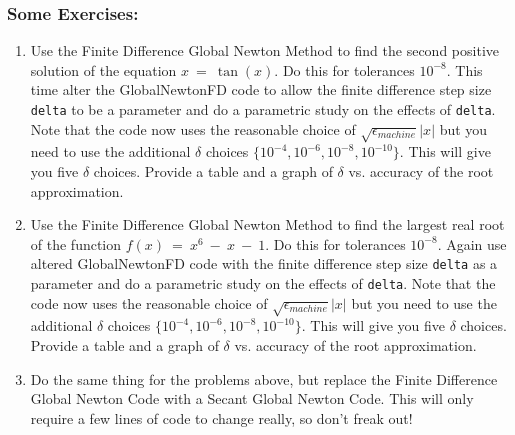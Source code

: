 \documentclass[11pt]{SelfArxOneColBMN}
\begin{document}
\subsubsection{Some Exercises:}

\begin{enumerate}
\item Use the Finite Difference Global Newton Method to find the second
      positive solution of the equation $x \: = \: \tan(x)$.  
      Do this for tolerances 
      $10^{-8}$.  This time alter the GlobalNewtonFD code to
      allow the finite difference step size {\tt delta}
      to be a parameter and do a parametric study on the
      effects of {\tt delta}.  Note that the code now uses
      the reasonable choice of $\sqrt{\epsilon_{machine}} |x|$ but you
      need to use the additional $\delta$ choices
      $\{10^{-4}, 10^{-6}, 10^{-8}, 10^{-10}\}$.  This will give you
      five $\delta$ choices. 
      Provide a table
      and a graph of $\delta$ vs. accuracy of the root approximation.
\item Use the Finite Difference Global Newton Method to 
      find the largest real root of the function
      $f(x) \: = \: x^6 \: - \: x \: - \: 1$.
      Do this for tolerances 
      $10^{-8}$.  Again use altered GlobalNewtonFD code
      with the finite difference step size {\tt delta}
      as a parameter and do a parametric study on the
      effects of {\tt delta}.  Note that the code now uses
      the reasonable choice of $\sqrt{\epsilon_{machine}} |x|$ but you
      need to use the additional $\delta$ choices
      $\{10^{-4}, 10^{-6}, 10^{-8}, 10^{-10}\}$.  This will give you
      five $\delta$ choices. 
      Provide a table
      and a graph of $\delta$ vs. accuracy of the root approximation. 
\item Do the same thing for the problems above, but replace the
      Finite Difference Global Newton Code with a Secant Global
      Newton Code.  This will only require a few lines of code to
      change really, so don't freak out!          
\end{enumerate}
\end{document}
